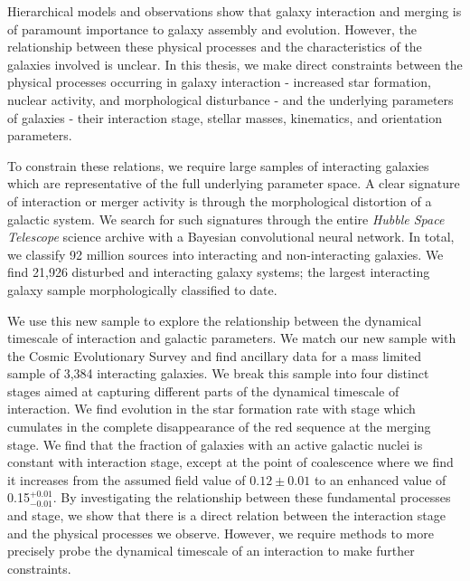 

\begin{abstracts}        %
Hierarchical models and observations show that galaxy interaction and merging is of paramount importance to galaxy assembly and evolution. However, the relationship between these physical processes and the characteristics of the galaxies involved is unclear. In this thesis, we make direct constraints between the physical processes occurring in galaxy interaction - increased star formation, nuclear activity, and morphological disturbance - and the underlying parameters of galaxies - their interaction stage, stellar masses, kinematics, and orientation parameters. 

To constrain these relations, we require large samples of interacting galaxies which are representative of the full underlying parameter space. A clear signature of interaction or merger activity is through the morphological distortion of a galactic system. We search for such signatures through the entire \emph{Hubble Space Telescope} science archive with a Bayesian convolutional neural network. In total, we classify 92 million sources into interacting and non-interacting galaxies. We find 21,926 disturbed and interacting galaxy systems; the largest interacting galaxy sample morphologically classified to date. 

We use this new sample to explore the relationship between the dynamical timescale of interaction and galactic parameters. We match our new sample with the Cosmic Evolutionary Survey and find ancillary data for a mass limited sample of 3,384 interacting galaxies. We break this sample into four distinct stages aimed at capturing different parts of the dynamical timescale of interaction. We find evolution in the star formation rate with stage which cumulates in the complete disappearance of the red sequence at the merging stage. We find that the fraction of galaxies with an active galactic nuclei is constant with interaction stage, except at the point of coalescence where we find it increases from the assumed field value of $0.12\pm0.01$ to an enhanced value of 0.15$^{+0.01}_{-0.01}$. By investigating the relationship between these fundamental processes and stage, we show that there is a direct relation between the interaction stage and the physical processes we observe. However, we require methods to more precisely probe the dynamical timescale of an interaction to make further constraints.


\end{abstracts}
